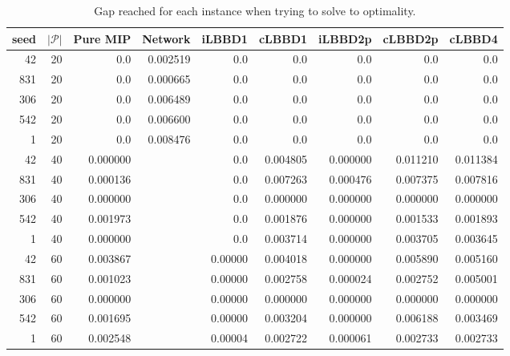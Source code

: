 \begin{table*}
    \centering
    \caption{Gap reached for each instance when trying to solve to optimality.}
    \begin{tabular}{rrrrrrrrr} \toprule
        seed & $|\mathcal{P}|$ & Pure MIP & Network & iLBBD1 & cLBBD1 & iLBBD2p & cLBBD2p & cLBBD4 \\\midrule
        42     &       20 & 0.0 &0.002519&    0.0  &   0.0   &   0.0   &   0.0   &   0.0 \\
        831      &      20 & 0.0 &0.000665&    0.0  &   0.0  &    0.0   &   0.0   &   0.0\\
        306      &      20 & 0.0 &0.006489&    0.0  &   0.0  &    0.0   &   0.0   &   0.0\\
        542      &      20  &0.0 &0.006600&    0.0  &   0.0  &    0.0  &    0.0   &   0.0\\
        1       &     20 & 0.0   &0.008476&  0.0  &   0.0   &   0.0   &   0.0   &   0.0\\\midrule
       42       &     40&  0.000000 &&    0.0&  0.004805&  0.000000 & 0.011210 & 0.011384\\
       831      &      40 & 0.000136 &&    0.0&  0.007263 & 0.000476&  0.007375&  0.007816\\
        306     &       40 & 0.000000 &&    0.0&  0.000000&  0.000000 & 0.000000&  0.000000\\
       542      &      40&  0.001973  &&   0.0&  0.001876  &0.000000 & 0.001533 & 0.001893\\
         1      &      40 & 0.000000  &&   0.0 & 0.003714 & 0.000000 & 0.003705 & 0.003645\\\midrule
        42       &     60&  0.003867&&  0.00000&  0.004018 & 0.000000 & 0.005890 & 0.005160 \\
        831      &      60&  0.001023&&  0.00000&  0.002758&  0.000024&  0.002752&  0.005001\\
        306      &      60&  0.000000&&  0.00000&  0.000000&  0.000000&  0.000000 & 0.000000\\
        542      &      60 & 0.001695&&  0.00000&  0.003204&  0.000000&  0.006188 & 0.003469\\
        1        &    60 & 0.002548&&  0.00004&  0.002722 & 0.000061 & 0.002733 & 0.002733\\
      \bottomrule
    \end{tabular}
\end{table*}
